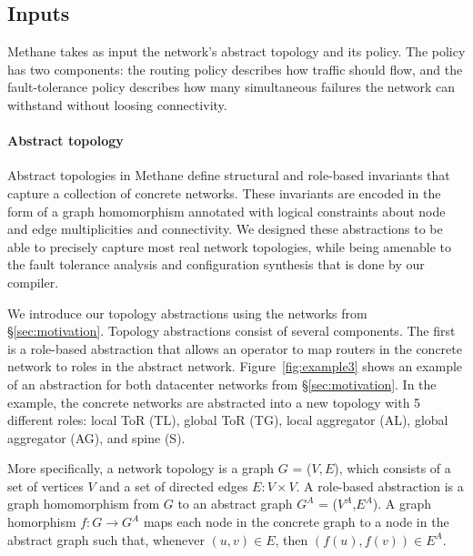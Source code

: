 \documentclass[numbers, 10pt, preprint]{sigplanconf}
\newcommand{\sysname}{{\small \sf Methane}\xspace}
\newcommand{\para}[1]{\paragraph*{\textbf{#1}}}
\begin{document}
\subsection{Inputs}

\sysname takes as input the network's abstract topology and its policy. The policy has two components: the routing policy describes how traffic should flow, and the fault-tolerance policy describes how many simultaneous failures the network can withstand without loosing connectivity.

\para{Abstract topology}
Abstract topologies in \sysname define structural and role-based invariants that capture a collection of concrete networks. These invariants are encoded in the form of a graph homomorphism annotated with logical constraints about node and edge multiplicities and connectivity.
%
We designed these abstractions to be able to precisely capture most real network topologies, while being amenable to the fault tolerance analysis and configuration synthesis that is done by our compiler.


We introduce our topology abstractions using the networks from \S\ref{sec:motivation}. Topology abstractions consist of several components.
The first is a role-based abstraction that allows an operator to map routers in the concrete network to roles in the abstract network. Figure~\ref{fig:example3} shows an example of an abstraction for both datacenter networks from \S\ref{sec:motivation}. In the example, the concrete networks are abstracted into a new topology with 5 different roles: local ToR (TL), global ToR (TG), local aggregator (AL), global aggregator (AG), and spine (S).

More specifically, a network topology is a graph $G$ = ($V, E$), which consists of a set of vertices $V$ and a set of directed edges $E \colon V \times V$. A role-based abstraction is a graph homomorphism from $G$ to an abstract graph $G^A$ = ($V^A$,$E^A$). A graph homorphism $f : G \rightarrow G^A$ maps each node in the concrete graph to a node in the abstract graph such that, whenever $(u,v) \in E$, then $(f(u),f(v)) \in E^A$.
\end{document}
